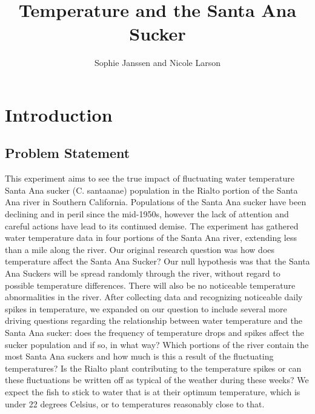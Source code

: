 \documentclass{article}
\title{Temperature and the Santa Ana Sucker}
\author{Sophie Janssen and Nicole Larson}
\begin{document}


\maketitle

\newpage
\tableofcontents
\newpage

\section{Introduction}

\subsection{Problem Statement}
This experiment aims to see the true impact of fluctuating water temperature Santa Ana sucker (C. santaanae) population in the Rialto portion of the Santa Ana river in Southern California. Populations of the Santa Ana sucker have been declining and in peril since the mid-1950s, however the lack of attention and careful actions have lead to its continued demise. The experiment has gathered water temperature data in four portions of the Santa Ana river, extending less than a mile along the river. Our original research question was how does temperature affect the Santa Ana Sucker? Our null hypothesis was that the Santa Ana Suckers will be spread randomly through the river, without regard to possible temperature differences. There will also be no noticeable temperature abnormalities in the river. After collecting data and recognizing noticeable daily spikes in temperature, we expanded on our question to include several more driving questions regarding the relationship between water temperature and the Santa Ana sucker: does the frequency of temperature drops and spikes affect the sucker population and if so, in what way? Which portions of the river contain the most Santa Ana suckers and how much is this a result of the fluctuating temperatures? Is the Rialto plant contributing to the temperature spikes or can these fluctuations be written off as typical of the weather during these weeks? We expect the fish to stick to water that is at their optimum temperature, which is under 22 degrees Celsius, or to temperatures reasonably close to that. 
\end{document}
